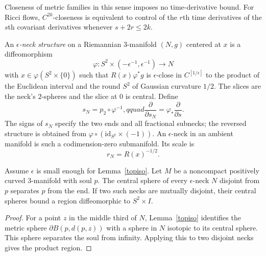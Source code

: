 \begin{remark}
\label{rem:ricci-flow-metric-topology}

Closeness of metric families in this sense imposes no time-derivative
bound. For Ricci flows, $C^{2k}$-closeness is equivalent to control of
the $r$th time derivatives of the $s$th covariant derivatives whenever
$s+2r\le2k$.
\end{remark}

\begin{definition}
\label{def:epsilon-neck}


\label{epsneck}

An \emph{$\epsilon$-neck structure} on a Riemannian $3$-manifold
$(N,g)$ centered at $x$ is a diffeomorphism
$$\varphi\colon S^2\times(-\epsilon^{-1},\epsilon^{-1})\to N$$
with $x\in\varphi(S^2\times\{0\})$ such that
$R(x)\varphi^*g$ is $\epsilon$-close in $C^{[1/\epsilon]}$ to the
product of the Euclidean interval and the round $S^2$ of Gaussian
curvature $1/2$. The slices are the neck's $2$-spheres and the slice at
$0$ is central. Define
$$s_N=p_2\circ\varphi^{-1},qquad
\frac{\partial}{\partial s_N}=\varphi_*\frac{\partial}{\partial s}.$$
The signs of $s_N$ specify the two ends and all fractional subnecks; the
reversed structure is obtained from
$\varphi\circ(\mathrm{id}_{S^2}\times(-1))$. An $\epsilon$-neck in an
ambient manifold is such a codimension-zero submanifold. Its scale is
$$r_N=R(x)^{-1/2}.$$
\end{definition}

\begin{lemma}
\label{lem:epsilon-neck-separates}
\label{neckseparate}

Assume $\epsilon$ is small enough for Lemma~\ref{topiso}. Let $M$ be a
noncompact positively curved $3$-manifold with soul $p$. The central
sphere of every $\epsilon$-neck $N$ disjoint from $p$ separates $p$
from the end. If two such necks are mutually disjoint, their central
spheres bound a region diffeomorphic to $S^2\times I$.
\end{lemma}
\begin{proof}
\sketch
{}
For a point $z$ in the middle third of $N$, Lemma~\ref{topiso}
identifies the metric sphere $\partial B(p,d(p,z))$ with a sphere in
$N$ isotopic to its central sphere. This sphere separates the soul from
infinity. Applying this to two disjoint necks gives the product region.
\end{proof}

